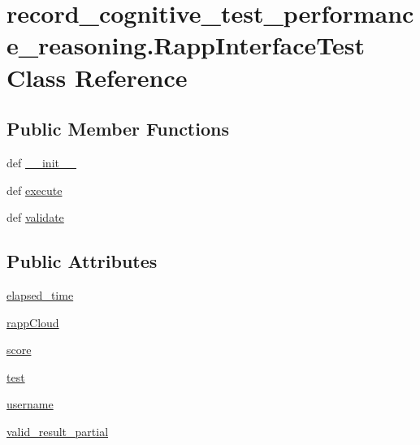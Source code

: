 \hypertarget{classrecord__cognitive__test__performance__reasoning_1_1RappInterfaceTest}{\section{record\-\_\-cognitive\-\_\-test\-\_\-performance\-\_\-reasoning.\-Rapp\-Interface\-Test Class Reference}
\label{classrecord__cognitive__test__performance__reasoning_1_1RappInterfaceTest}
}
\subsection*{Public Member Functions}
\begin{DoxyCompactItemize}
\item 
def \hyperlink{classrecord__cognitive__test__performance__reasoning_1_1RappInterfaceTest_add86daff43046d8b01ce41a948c9ebba}{\-\_\-\-\_\-init\-\_\-\-\_\-}
\item 
def \hyperlink{classrecord__cognitive__test__performance__reasoning_1_1RappInterfaceTest_a8ba6de74fa274371183ee42125e82c4c}{execute}
\item 
def \hyperlink{classrecord__cognitive__test__performance__reasoning_1_1RappInterfaceTest_a1fef697a7e812c742f28ca402c3ac115}{validate}
\end{DoxyCompactItemize}
\subsection*{Public Attributes}
\begin{DoxyCompactItemize}
\item 
\hyperlink{classrecord__cognitive__test__performance__reasoning_1_1RappInterfaceTest_a20b3ffdfc6f9744f693adf367c23e087}{elapsed\-\_\-time}
\item 
\hyperlink{classrecord__cognitive__test__performance__reasoning_1_1RappInterfaceTest_a72b0e1ff0c0d960b487623c38ed415b7}{rapp\-Cloud}
\item 
\hyperlink{classrecord__cognitive__test__performance__reasoning_1_1RappInterfaceTest_aadd674d5508b88cb86df69299217b334}{score}
\item 
\hyperlink{classrecord__cognitive__test__performance__reasoning_1_1RappInterfaceTest_af0df4cf1b4b950292883562d3749e3bb}{test}
\item 
\hyperlink{classrecord__cognitive__test__performance__reasoning_1_1RappInterfaceTest_a021b79eb32f2579dacdef5289ec6bd0a}{username}
\item 
\hyperlink{classrecord__cognitive__test__performance__reasoning_1_1RappInterfaceTest_a88b41c18bd3d4b835f7f693a88669a32}{valid\-\_\-result\-\_\-partial}
\end{DoxyCompactItemize}


